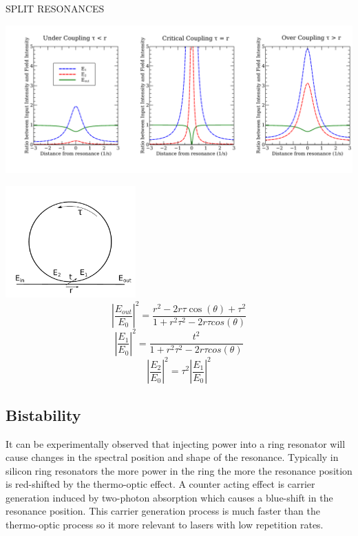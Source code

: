 SPLIT RESONANCES

\begingroup
    \centering  
    \includegraphics[width=18cm]{img/theory/coupling.pdf}
     \vspace{3pt} \label{crossCompare}
\endgroup

\begingroup
\centering
    \includegraphics[width=5cm]{img/theory/ring.pdf}
\endgroup
\begin{equation}
\left |\frac{E_{out}}{E_{0}}\right|^2=\frac{r^2-2r\tau\cos(\theta)+\tau^2}{1+r^2\tau^2-2r\tau cos(\theta)}
\end{equation}
\begin{equation}
\left|\frac{E_{1}}{E_{0}}\right |^2=\frac{t^2}{1+r^2\tau^2-2r\tau cos(\theta)}
\end{equation}
\begin{equation}
\left |\frac{E_{2}}{E_{0}}\right |^2=\tau^2\left|\frac{E_{1}}{E_{0}}\right |^2
\end{equation}

\subsection{Bistability}
It can be experimentally observed that injecting power into a ring resonator will cause changes in the spectral position and shape of the resonance. Typically in silicon ring resonators the more power in the ring the more the resonance position is red-shifted by the thermo-optic effect\cite{almeida_optical_2004-1}. A counter acting effect is carrier generation induced by two-photon absorption \cite{xu_carrier-induced_2006} which causes a blue-shift in the resonance position. This carrier generation process is much faster than the thermo-optic process so it more relevant to lasers with low repetition rates. 

